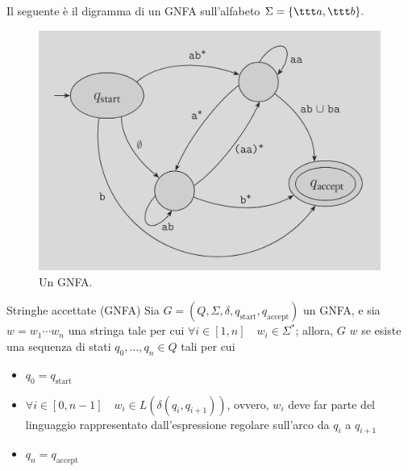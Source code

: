 \documentclass[a4paper, 12pt]{report}
\begin{document}
    \begin{example}[GNFA]
        Il seguente è il digramma di un GNFA sull'alfabeto $\Sigma = \{ \ttt a, \ttt b \}.$

        \begin{figure}[H]
            \centering
            \includegraphics[scale=0.3]{../assets/gnfa-neg.png}
            \caption{Un GNFA.}
        \end{figure}
    \end{example}

    \begin{frameddefn}{Stringhe accettate (GNFA)}
        Sia $G = (Q, \Sigma, \delta, q_{\mathrm{start}}, q_{\mathrm{accept}})$ un GNFA, e sia $w = w_1\cdots w_n$ una stringa tale per cui $\forall i \in [1, n] \quad w_i \in \Sigma^*$; allora, $G$  $w$ se esiste una sequenza di stati $q_0, \ldots, q_n \in Q$ tali per cui

        \begin{itemize}
            \item $q_0 = q_{\mathrm{start}}$
            \item $\forall i \in [0, n - 1] \quad w_i \in L(\delta(q_i, q_{i + 1}))$, ovvero, $w_i$ deve far parte del linguaggio rappresentato dall'espressione regolare sull'arco da $q_i$ a $q_{i + 1}$
            \item $q_n = q_{\mathrm{accept}}$
        \end{itemize}
    \end{frameddefn}
\end{document}
